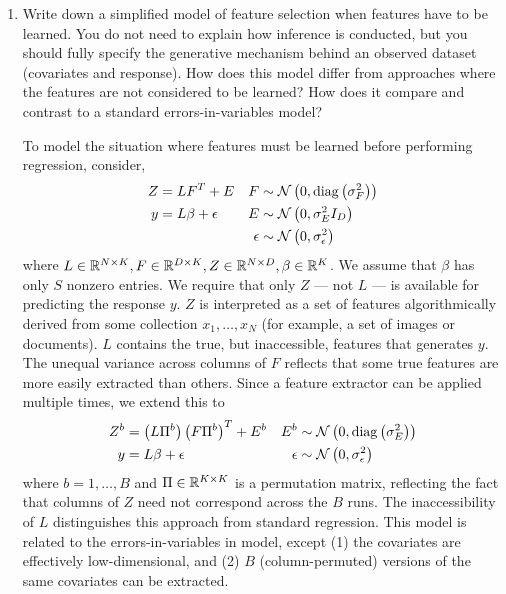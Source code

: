 \documentclass[]{article}
\begin{document}
\begin{enumerate}

\item Write down a simplified model of feature selection when features have to
be learned. You do not need to explain how inference is conducted, but you
should fully specify the generative mechanism behind an observed dataset
(covariates and response). How does this model differ from approaches where the
features are not considered to be learned? How does it compare and contrast to a
standard errors-in-variables model?

To model the situation where features must be learned before performing
regression, consider,
\begin{align*}
Z &= LF^T + E & F &\sim \Gsn\left(0, \diag\left(\*\sigma_{F}^2\right)\right)\\
y &= L \beta + \epsilon & E &\sim \Gsn\left(0, \sigma_{E}^2 I_{D}\right)\\
& & \epsilon &\sim \Gsn\left(0, \sigma_{\epsilon}^2\right)
\end{align*}
where $L \in \mathbb{R}^{N \times K}, F \in \mathbb{R}^{D \times K}, Z \in \mathbb{R}^{N
\times D}, \beta \in \mathbb{R}^{K}$. We assume that $\beta$ has only $S$ nonzero
entries. We require that only $Z$ — not $L$ — is available for predicting the
response $y$. $Z$ is interpreted as a set of features algorithmically derived
from some collection $x_1, \dots, x_N$ (for example, a set of images or
documents). $L$ contains the true, but inaccessible, features that generates
$y$. The unequal variance across columns of $F$ reflects that some true features
are more easily extracted than others. Since a feature extractor can be applied
multiple times, we extend this to
\begin{align*}
Z^{b} &= \left(L\Pi^{b}\right)\left(F \Pi^{b}\right)^T + E^{b} & E^{b} &\sim \Gsn\left(0, \diag\left(\*\sigma_{E}^2\right)\right) \\
y &= L \beta + \epsilon & \epsilon &\sim \Gsn\left(0, \sigma_{\epsilon}^2\right)
\end{align*}
where $b = 1, \dots, B$ and $\Pi \in \mathbb{R}^{K \times K}$ is a permutation
matrix, reflecting the fact that columns of $Z$ need not correspond across the
$B$ runs. The inaccessibility of $L$ distinguishes this approach from standard
regression. This model is related to the errors-in-variables in model, except
(1) the covariates are effectively low-dimensional, and (2) $B$
(column-permuted) versions of the same covariates can be extracted.


\end{enumerate}
\end{document}

